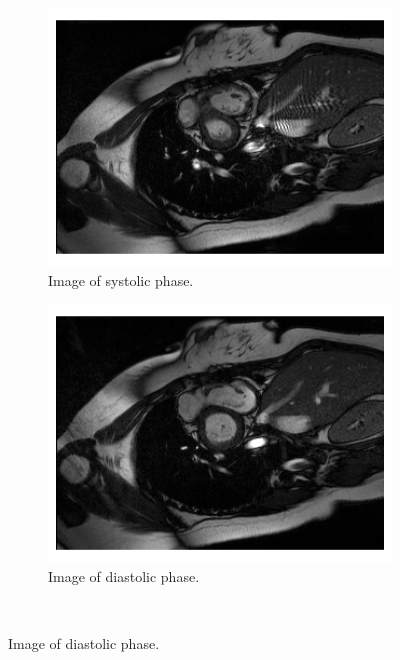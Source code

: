 \documentclass[english,version-2022-01]{uzl-thesis} %
\begin{document}
\begin{figure}[h]%
	\centering
	\graphicspath{{images/}{\main/images/}}
	\begin{subfigure}{0.4\textwidth}
    		\includegraphics[width=\textwidth]{Image_ACDC_systolic.png}
    		\caption{Image of systolic phase.}
    		\label{fig:Image_ACDC_systolic}
	\end{subfigure}
	\hfill
	\graphicspath{{images/}{\main/images/}}
	\begin{subfigure}{0.4\textwidth}
    		\includegraphics[width=\textwidth]{Image_ACDC_diastolic.png}
    		\caption{Image of diastolic phase.}
    		\label{fig:Image_ACDC_diastolic}
	\end{subfigure} 
	\\

\end{figure}
\end{document}
